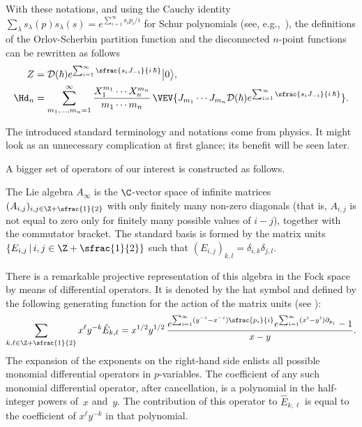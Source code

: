 With these notations, and using the Cauchy identity $\sum_\lambda s_\lambda(p)s_\lambda(s)=e^{\sum_{i=1}^\infty s_ip_i/i}$ for Schur polynomials (see, e.g.,~\cite[p.\,386]{Stanley}), the definitions of the Orlov-Scherbin partition function and the disconnected $n$-point functions can be rewritten as follows
\begin{align}
Z&=\mathcal{D}(\hbar)e^{\sum_{i=1}^\infty \sfrac{s_iJ_{-i}}{i\,\hbar}}\big|0\big\rangle,\notag\\
\Hd_n&=\sum_{m_1,\dots,m_n=1}^\infty \frac{X_1^{m_1}\cdots X_n^{m_n}}{m_1\cdots m_n}\,
\VEV{J_{m_1}\cdots J_{m_n}\mathcal{D}(\hbar)e^{\sum_{i=1}^\infty \sfrac{s_iJ_{-i}}{i\,\hbar}}}.\label{eq:Hd}
\end{align}

The introduced standard terminology and notations come from physics. It might look as an unnecessary complication at first glance; its benefit will be seen later.

A bigger set of operators of our interest is constructed as follows.

\begin{definition}
The Lie algebra $A_\infty$ is the $\C$-vector space of infinite matrices $(A_{i,j})_{i,j\in \Z+\sfrac{1}{2}}$ with
only finitely many non-zero diagonals (that is, $A_{i,j}$ is not equal to zero only for finitely
many possible values of $i-j$), together with the commutator bracket. The standard basis is formed by the matrix units $\{E_{i,j}\,|\, i,j \in \Z+\sfrac{1}{2}\}$ such that $(E_{i,j})_{k,l} = \delta_{i,k}\delta_{j,l}$.
\end{definition}

\Changelback
There is a remarkable projective representation of this algebra in the Fock space by means of differential operators. It is denoted by the hat symbol and defined by the following generating function for the action of the matrix units (see \eg \cite[\S 6.2]{MiwaJimboDate}):
\begin{equation}\label{eq:A-action}
\sum_{k,\ell\in\Z+\sfrac{1}{2}}x^{\ell} y^{-k} \hat E_{k,\ell}=
x^{1/2}y^{1/2}\,\frac{
e^{\sum_{i=1}^\infty (y^{-i}-x^{-i}) \sfrac{p_i}{i} }
e^{\sum_{i=1}^\infty (x^i-y^i)\partial_{p_i}}-1}
{x-y}.
\end{equation}
The expansion of the exponents on the right-hand side enlists all possible monomial differential operators in $p$-variables. The coefficient of any such monomial differential operator, after cancellation, is a polynomial in the half-integer powers of~$x$ and~$y$. The contribution of this operator to $\hat E_{k,\ell}$ is equal to the coefficient of
$x^{\ell} y^{-k}$ in that polynomial.

